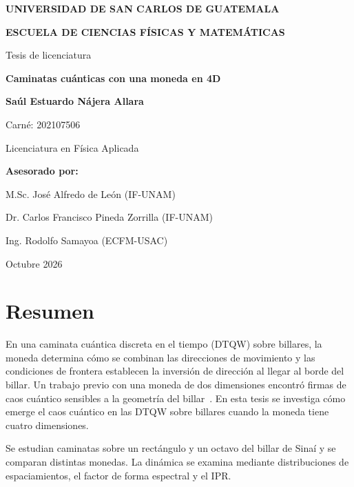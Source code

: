 \documentclass[12pt,a4paper,oneside]{report} %
\newcommand{\tituloTesis}{Caminatas cuánticas con una moneda en 4D}
\newcommand{\autorTesis}{Saúl Estuardo Nájera Allara}
\newcommand{\carneTesis}{202107506}
\newcommand{\fechaTesis}{Octubre 2026}
\begin{document}
\begin{titlepage} %
  \centering
  {\Large\bfseries UNIVERSIDAD DE SAN CARLOS DE GUATEMALA\par}
  \vspace{0.4cm}
  {\Large\bfseries ESCUELA DE CIENCIAS FÍSICAS Y MATEMÁTICAS\par}
  \vfill
  {\large Tesis de licenciatura\par}
  \vspace{0.5cm}
  {\LARGE\bfseries \tituloTesis\par}
  \vfill
  {\large\bfseries \autorTesis\par}
  {\large Carné: \carneTesis\par}
  \vspace{0.9cm}
  {\large Licenciatura en Física Aplicada\par}
  \vspace{0.9cm}
  {\bfseries Asesorado por:\par}
  M.Sc. José Alfredo de León (IF-UNAM)\par
  Dr. Carlos Francisco Pineda Zorrilla (IF-UNAM)\par
  Ing. Rodolfo Samayoa (ECFM-USAC)\par
  \vfill
  {\fechaTesis\par}
\end{titlepage} %
\chapter*{Resumen} %
{}

En una caminata cuántica discreta en el tiempo (DTQW) sobre billares, la moneda determina cómo se combinan las direcciones de movimiento y las condiciones de frontera establecen la inversión de dirección al llegar al borde del billar. Un trabajo previo con una moneda de dos dimensiones encontró firmas de caos cuántico sensibles a la geometría del billar~\cite{alonso-lobo2025simplest}. En esta tesis se investiga cómo emerge el caos cuántico en las DTQW sobre billares cuando la moneda tiene cuatro dimensiones.

Se estudian caminatas sobre un rectángulo y un octavo del billar de Sinaí y se comparan distintas monedas. La dinámica se examina mediante distribuciones de espaciamientos, el factor de forma espectral y el IPR.
\end{document}
